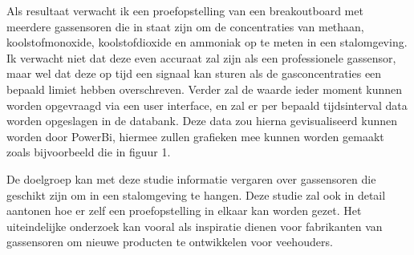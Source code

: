 Als resultaat verwacht ik een proefopstelling van een breakoutboard met meerdere gassensoren die in staat zijn om de concentraties van methaan, koolstofmonoxide, koolstofdioxide en ammoniak op te meten in een stalomgeving. Ik verwacht niet dat deze even accuraat zal zijn als een professionele gassensor, maar wel dat deze op tijd een signaal kan sturen als de gasconcentraties een bepaald limiet hebben overschreven. Verder zal de waarde ieder moment kunnen worden opgevraagd via een user interface, en zal er per bepaald tijdsinterval data worden opgeslagen in de databank. Deze data zou hierna gevisualiseerd kunnen worden door PowerBi, hiermee zullen grafieken mee kunnen worden gemaakt zoals bijvoorbeeld die in figuur 1.

De doelgroep kan met deze studie informatie vergaren over gassensoren die geschikt zijn om in een stalomgeving te hangen. Deze studie zal ook in detail aantonen hoe er zelf een proefopstelling in elkaar kan worden gezet. Het uiteindelijke onderzoek kan vooral als inspiratie dienen voor fabrikanten van gassensoren om nieuwe producten te ontwikkelen voor veehouders.








